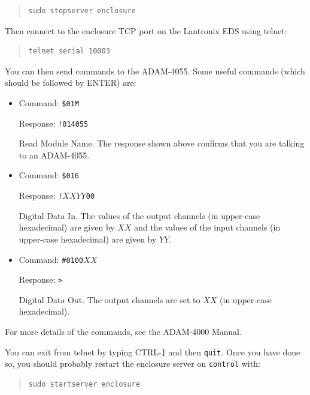 \begin{quotation}
\begin{verbatim}
sudo stopserver enclosure
\end{verbatim}
\end{quotation}

Then connect to the enclosure TCP port on the Lantronix EDS using telnet:

\begin{quotation}
\begin{verbatim}
telnet serial 10003
\end{verbatim}
\end{quotation}

You can then send commands to the ADAM-4055. Some useful commands (which should be followed by ENTER) are:

\begin{itemize}
\item Command: \verb|$01M|

Response: \verb|!014055|

Read Module Name. The response shown above confirms that you are talking to an ADAM-4055.

\item 
Command: \verb|$016|

Response: \verb|!|$XXYY$\verb|00|

Digital Data In. The values of the output channels (in upper-case hexadecimal) are given by $XX$ and the values of the input channels (in upper-case hexadecimal) are given by $YY$.

\item 
Command: \verb|#0100|$XX$

Response: \verb|>|

Digital Data Out. The output channels are set to $XX$ (in upper-case hexadecimal).

\end{itemize}

For more details of the commands, see the ADAM-4000 Manual.

You can exit from telnet by typing CTRL-\verb|]| and then \verb|quit|. Once you have done so, you should probably restart the enclosure server on \verb|control| with:

\begin{quotation}
\begin{verbatim}
sudo startserver enclosure
\end{verbatim}
\end{quotation}

